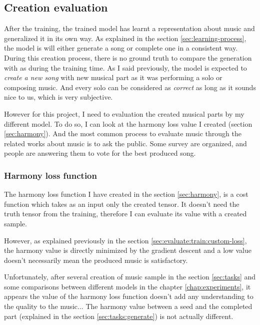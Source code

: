 \documentclass[12pt]{report}
\begin{document}
\subsection{Creation evaluation}

After the training, the trained model has learnt a representation about music and generalized it in its own way.
As explained in the section \ref{sec:learning-process}, the model is will either generate a song or complete one in a consistent way.
During this creation process, there is no ground truth to compare the generation with as during the training time.
As I said previously, the model is expected to \textit{create a new song} with new musical part as it was performing a solo or composing music.
And every solo can be considered as \textit{correct} as long as it sounds nice to us, which is very subjective.

However for this project, I need to evaluation the created musical parts by my different model.
To do so, I can look at the harmony loss value I created (section \ref{sec:harmony}).
And the most common process to evaluate music through the related works about music is to ask the public.
Some survey are organized, and people are answering them to vote for the best produced song.

\subsubsection{Harmony loss function}
\label{sec:eval:creation:harmony}

The harmony loss function I have created in the section \ref{sec:harmony}, is a cost function which takes as an input only the created tensor.
It doesn't need the truth tensor from the training, therefore I can evaluate its value with a created sample.

However, as explained previously in the section \ref{sec:evaluate:train:custom-loss}, the harmony value is directly minimized by the gradient descent and a low value doesn't necessarily mean the produced music is satisfactory.

Unfortunately, after several creation of music sample in the section \ref{sec:tasks} and some comparisons between different models in the chapter \ref{chap:experiments}, it appears the value of the harmony loss function doesn't add any understanding to the quality to the music...
The harmony value between a seed and the completed part (explained in the section \ref{sec:tasks:generate}) is not actually different.
\end{document}
